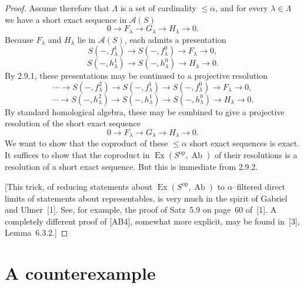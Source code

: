 \documentclass[11pt,a4paper]{article}
\theoremstyle{plain}
\theoremstyle{definition}
\DeclareMathOperator{\Ex}{Ex}
\DeclareMathOperator{\Ab}{Ab}
\newcommand{\op}{\mathrm{op}}
\numberwithin{equation}{section}
\begin{document}
\begin{proof}
Assume therefore that $\Lambda$ is a set of cardinality $\leq\alpha$, and for every $\lambda \in \Lambda$ we have a short exact sequence in $\mathcal{A}(S)$
\begin{equation*}
0 \longrightarrow F_{\lambda} \longrightarrow G_{\lambda} \longrightarrow H_{\lambda} \longrightarrow 0.
\end{equation*}
Because $F_{\lambda}$ and $H_{\lambda}$ lie in $\mathcal{A}(S)$, each admits a presentation
\begin{equation*}
S(-,f_{\lambda}^{1}) \longrightarrow S(-,f_{\lambda}^{0}) \longrightarrow F_{\lambda} \longrightarrow 0,
\end{equation*}
\begin{equation*}
S(-,h_{\lambda}^{1}) \longrightarrow S(-,h_{\lambda}^{0}) \longrightarrow H_{\lambda} \longrightarrow 0.
\end{equation*}
By 2.9.1, these presentations may be continued to a projective resolution
\begin{equation*}
\cdots \longrightarrow S(-,f_{\lambda}^{2}) \longrightarrow S(-,f_{\lambda}^{1}) \longrightarrow S(-,f_{\lambda}^{0}) \longrightarrow F_{\lambda} \longrightarrow 0,
\end{equation*}
\begin{equation*}
\cdots \longrightarrow S(-,h_{\lambda}^{2}) \longrightarrow S(-,h_{\lambda}^{1}) \longrightarrow S(-,h_{\lambda}^{0}) \longrightarrow H_{\lambda} \longrightarrow 0.
\end{equation*}
By standard homological algebra, these may be combined to give a projective resolution of the short exact sequence
\begin{equation*}
0 \longrightarrow F_{\lambda} \longrightarrow G_{\lambda} \longrightarrow H_{\lambda} \longrightarrow 0.
\end{equation*}
We want to show that the coproduct of these $\leq\alpha$ short exact sequences is exact. It suffices to show that the coproduct in $\Ex(S^{\op},\Ab)$ of their resolutions is a resolution of a short exact sequence. But this is immediate from 2.9.2.

[This trick, of reducing statements about $\Ex(S^{\op},\Ab)$ to $\alpha$--filtered direct limits of statements about representables, is very much in the spirit of Gabriel and Ulmer~[1]. See, for example, the proof of Satz~5.9 on page~60 of~[1]. A completely different proof of [AB4], somewhat more explicit, may be found in~[3], Lemma~6.3.2.]
\end{proof}


\section{A counterexample}
\end{document}
